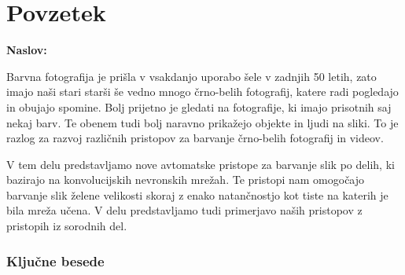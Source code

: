 \chapter*{Povzetek}

\noindent\textbf{Naslov:} \ttitle
\bigskip

Barvna fotografija je prišla v vsakdanjo uporabo šele v zadnjih 50 letih, zato imajo naši stari starši še vedno mnogo črno-belih fotografij, katere radi pogledajo in obujajo spomine. Bolj prijetno je gledati na fotografije, ki imajo prisotnih saj nekaj barv. Te obenem tudi bolj naravno prikažejo objekte in ljudi na sliki. To je razlog za razvoj različnih pristopov za barvanje črno-belih fotografij in videov. 

V tem delu predstavljamo nove avtomatske pristope za barvanje slik po delih, ki bazirajo na konvolucijskih nevronskih mrežah. Te pristopi nam omogočajo barvanje slik želene velikosti skoraj z enako natančnostjo kot tiste na katerih je bila mreža učena. V delu predstavljamo tudi primerjavo naših pristopov z pristopih iz sorodnih del. 

\subsection*{Ključne besede}
\textit{\tkeywords}
\clearemptydoublepage